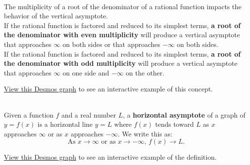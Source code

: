 \begin{myDefinition}~\\[0.5mm]
The multiplicity of a root of the denominator of a rational function impacts the behavior of the vertical asymptote.\\

If the rational function is factored and reduced to its simplest terms, {\bf a root of the denominator with even multiplicity} will produce a vertical asymptote that approaches $\infty$ on both sides or that approaches $-\infty$ on both sides.\\

If the rational function is factored and reduced to its simplest terms, {\bf a root of the denominator with odd multiplicity} will produce a vertical asymptote that approaches $\infty$ on one side and $-\infty$ on the other.  \\

\begin{minipage}{0.9\linewidth}
 \href{http://tiny.cc/111Z-MultiplicityAndVA}{View this Desmos graph} to see an interactive example of this concept.  %
\end{minipage}
\begin{minipage}{0.1\linewidth}
\flushright {}
\end{minipage}
\end{myDefinition}



\begin{myDefinition}~\\[0.5mm]
Given a function $f$ and a real number $L$, a {\bf horizontal asymptote} of a graph of $y=f(x)$ is a horizontal line $y=L$ where $f(x)$ tends toward $L$  as $x$ approaches $\infty$ or as $x$ approaches $-\infty$. We write this as:
$$\text{As $x\rightarrow \infty$ or as $x\rightarrow -\infty$, $f(x) \rightarrow L$.}$$
\begin{minipage}{0.9\linewidth}
 \href{http://tiny.cc/111Z-HorizAsymp}{View this Desmos graph} to see an interactive example of the definition.  %
\end{minipage}
\begin{minipage}{0.1\linewidth}
\flushright {}
\end{minipage}
\end{myDefinition}





